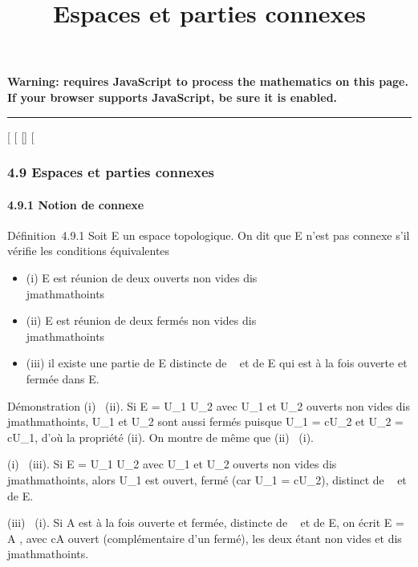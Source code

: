 \documentclass[]{article}
\title{Espaces et parties connexes}
\author{}
\date{}
\begin{document}
\maketitle

\textbf{Warning: 
requires JavaScript to process the mathematics on this page.\\ If your
browser supports JavaScript, be sure it is enabled.}

\begin{center}\rule{3in}{0.4pt}\end{center}

{[}
{[}
{[}{]}
{[}

\subsubsection{4.9 Espaces et parties connexes}

\paragraph{4.9.1 Notion de connexe}

Définition~4.9.1 Soit E un espace topologique. On dit que E n'est pas
connexe s'il vérifie les conditions équivalentes

\begin{itemize}
\itemsep1pt\parskip0pt
\item
  (i) E est réunion de deux ouverts non vides dis\\jmathmathoints
\item
  (ii) E est réunion de deux fermés non vides dis\\jmathmathoints
\item
  (iii) il existe une partie de E distincte de \varnothing~ et de E qui est à la
  fois ouverte et fermée dans E.
\end{itemize}

Démonstration (i) \rigtharrow~(ii). Si E = U_1 \cup U_2 avec
U_1 et U_2 ouverts non vides dis\\jmathmathoints, U_1
et U_2 sont aussi fermés puisque U_1 = cU_2
et U_2 = cU_1, d'où la propriété (ii). On montre de
même que (ii) \rigtharrow~(i).

(i) \rigtharrow~(iii). Si E = U_1 \cup U_2 avec U_1 et
U_2 ouverts non vides dis\\jmathmathoints, alors U_1 est ouvert,
fermé (car U_1 = cU_2), distinct de \varnothing~ et de E.

(iii) \rigtharrow~(i). Si A est à la fois ouverte et fermée, distincte de \varnothing~ et de
E, on écrit E = A \cupcA, avec cA ouvert (complémentaire d'un fermé), les
deux étant non vides et dis\\jmathmathoints.
\end{document}

